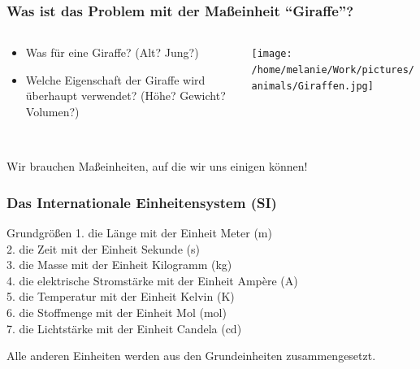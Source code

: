 \documentclass{beamer}
\begin{document}
\begin{frame}
\frametitle{Was ist das Problem mit der Maßeinheit ``Giraffe''?}


\begin{columns}

\begin{column}{5cm}


\begin{itemize}
\item
Was für eine Giraffe? (Alt? Jung?)  
\item
Welche Eigenschaft der Giraffe wird überhaupt verwendet? (Höhe? Gewicht? Volumen?)

\end{itemize}

\end{column}

\begin{column}{5cm}

\begin{center}
\texttt{[image: /home/melanie/Work/pictures/animals/Giraffen.jpg]}
\end{center}



\end{column}
 


\end{columns}


$\,$\\[0.5 cm]
Wir brauchen Maßeinheiten, auf die wir uns einigen können! 

\end{frame}



\begin{frame}

\frametitle{Das Internationale Einheitensystem (SI)}


\begin{block}{Grundgrößen}
1. die Länge mit der Einheit Meter (m) \\
2. die Zeit mit der Einheit Sekunde (s) \\
3. die Masse mit der Einheit Kilogramm (kg) \\
4. die elektrische Stromstärke mit der Einheit Ampère (A) \\
5. die Temperatur mit der Einheit Kelvin (K) \\
6. die Stoffmenge mit der Einheit Mol (mol) \\
7. die Lichtstärke mit der Einheit Candela (cd) \\
\end{block}

\pause

Alle anderen Einheiten werden aus den Grundeinheiten zusammengesetzt. 

\end{frame}
\end{document}
